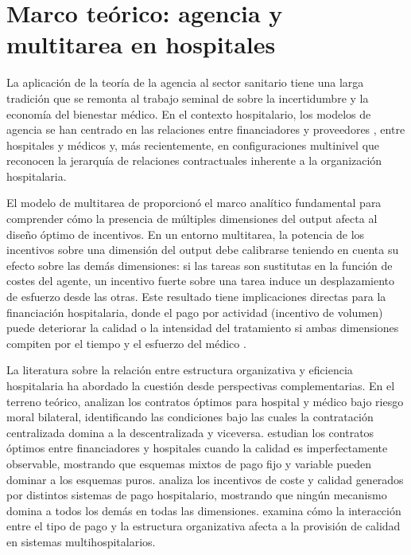 \documentclass[12pt, a4paper, twoside, openright]{book}
\theoremstyle{plain}
\theoremstyle{definition}
\theoremstyle{remark}
\begin{document}
\section{Marco teórico: agencia y multitarea en hospitales}

La aplicación de la teoría de la agencia al sector sanitario tiene una larga tradición que se remonta al trabajo seminal de \citet{arrow1963} sobre la incertidumbre y la economía del bienestar médico. En el contexto hospitalario, los modelos de agencia se han centrado en las relaciones entre financiadores y proveedores \citep{ellis1986,mcclellan1997}, entre hospitales y médicos \citep{ma1997,jelovac2002} y, más recientemente, en configuraciones multinivel que reconocen la jerarquía de relaciones contractuales inherente a la organización hospitalaria.

El modelo de multitarea de \citet{holmstrom1991} proporcionó el marco analítico fundamental para comprender cómo la presencia de múltiples dimensiones del output afecta al diseño óptimo de incentivos. En un entorno multitarea, la potencia de los incentivos sobre una dimensión del output debe calibrarse teniendo en cuenta su efecto sobre las demás dimensiones: si las tareas son sustitutas en la función de costes del agente, un incentivo fuerte sobre una tarea induce un desplazamiento de esfuerzo desde las otras. Este resultado tiene implicaciones directas para la financiación hospitalaria, donde el pago por actividad (incentivo de volumen) puede deteriorar la calidad o la intensidad del tratamiento si ambas dimensiones compiten por el tiempo y el esfuerzo del médico \citep{eggleston2005,kaarboe2011}.

La literatura sobre la relación entre estructura organizativa y eficiencia hospitalaria ha abordado la cuestión desde perspectivas complementarias. En el terreno teórico, \citet{jelovac2002} analizan los contratos óptimos para hospital y médico bajo riesgo moral bilateral, identificando las condiciones bajo las cuales la contratación centralizada domina a la descentralizada y viceversa. \citet{chalkley1998} estudian los contratos óptimos entre financiadores y hospitales cuando la calidad es imperfectamente observable, mostrando que esquemas mixtos de pago fijo y variable pueden dominar a los esquemas puros. \citet{ma1994} analiza los incentivos de coste y calidad generados por distintos sistemas de pago hospitalario, mostrando que ningún mecanismo domina a todos los demás en todas las dimensiones. \citet{eggleston2005} examina cómo la interacción entre el tipo de pago y la estructura organizativa afecta a la provisión de calidad en sistemas multihospitalarios.
\end{document}
